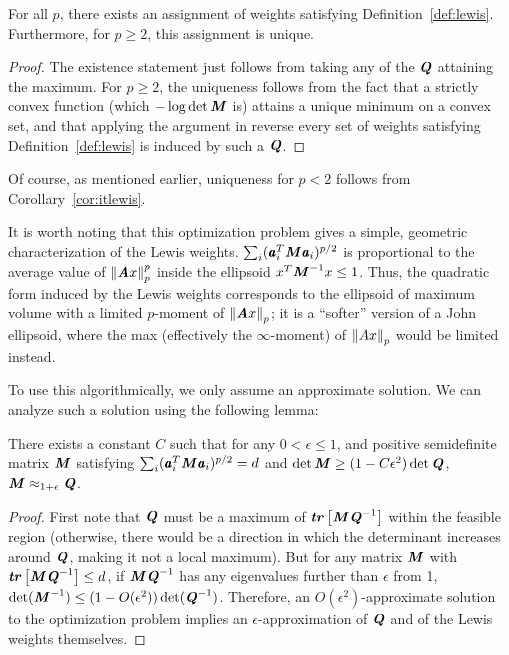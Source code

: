 \begin{corollary}
\label{cor:conlewis}
For all $p$, there exists an assignment of weights satisfying Definition~\ref{def:lewis}.
Furthermore, for $p \geq 2$, this assignment is unique.
\end{corollary}
\begin{proof}
The existence statement just follows from taking any of the $\boldsymbol{\mathit{Q}}$ attaining the maximum.
For $p \geq 2$, the uniqueness follows from the fact that a strictly convex function
(which $-\log \det \boldsymbol{\mathit{M}}$ is) attains a unique minimum on a convex set, and that applying
the argument in reverse every set of weights satisfying Definition~\ref{def:lewis}
is induced by such a $\boldsymbol{\mathit{Q}}$.
\end{proof}
Of course, as mentioned earlier, uniqueness for $p < 2$ follows from Corollary~\ref{cor:itlewis}.

It is worth noting that this optimization problem gives a simple, geometric
characterization of the Lewis weights.  $\sum_i (\pmb{\mathit{a}}_i^T \boldsymbol{\mathit{M}} \pmb{\mathit{a}}_i)^{p/2}$
is proportional to the average value of $\left\| \boldsymbol{\mathit{A}} x \right\|_p^p$ inside the ellipsoid
$x^T \boldsymbol{\mathit{M}}^{-1} x \leq 1$.  Thus, the quadratic form induced by the Lewis weights
corresponds to the ellipsoid of maximum volume with a limited $p$-moment of
$\left\| \boldsymbol{\mathit{A}} x \right\|_p$; it is a ``softer'' version of a John ellipsoid, where the max
(effectively the $\infty$-moment) of $\left\| Ax \right\|_p$ would be limited instead.

To use this algorithmically, we only assume an approximate solution.
We can analyze such a solution using the following lemma:
\begin{lemma}
There exists a constant $C$ such that for any $0 < \epsilon \leq 1$,
and positive semidefinite matrix $\boldsymbol{\mathit{M}}$ satisfying
$\sum_i (\pmb{\mathit{a}}_i^T \boldsymbol{\mathit{M}} \pmb{\mathit{a}}_i)^{p/2} = d$ and $\det \boldsymbol{\mathit{M}} \geq (1-C \epsilon^2) \det \boldsymbol{\mathit{Q}}$,
$\boldsymbol{\mathit{M}} \approx_{1+\epsilon} \boldsymbol{\mathit{Q}}$.
\end{lemma}
\begin{proof}
First note that $\boldsymbol{\mathit{Q}}$ must be a maximum of
${\boldsymbol{\mathit{tr}}}\left[ \boldsymbol{\mathit{M}} \boldsymbol{\mathit{Q}}^{-1} \right]$ within the feasible region (otherwise, there would be a
direction in which the determinant increases around $\boldsymbol{\mathit{Q}}$, making it not a local
maximum).  But for any matrix $\boldsymbol{\mathit{M}}$ with ${\boldsymbol{\mathit{tr}}}\left[ \boldsymbol{\mathit{M}} \boldsymbol{\mathit{Q}}^{-1} \right] \leq d$, if
$\boldsymbol{\mathit{M}} \boldsymbol{\mathit{Q}}^{-1}$ has any eigenvalues further than $\epsilon$ from 1,
$\det(\boldsymbol{\mathit{M}}^{-1}) \leq (1 - O(\epsilon^2)) \det(\boldsymbol{\mathit{Q}}^{-1})$.  Therefore,
an $O(\epsilon^2)$-approximate solution to the optimization problem implies
an $\epsilon$-approximation of $\boldsymbol{\mathit{Q}}$ and of the Lewis weights themselves.
\end{proof}

